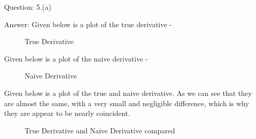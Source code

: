 \documentclass[a4paper]{article}
\begin{document}
\begin{qalist}
		\item[Question: 5.(a)] \setcounter{equation}{0}
		\item[Answer:] 	Given below is a plot of the true derivative - 
			\begin{figure}[H]			
				\vspace{0.5cm}
				\centering
				\caption{True Derivative} 
				\label{fig:q5_a_1}
				\vspace{0.5cm}
			\end{figure}
			Given below is a plot of the naive derivative - 
			\begin{figure}[H]			
				\vspace{0.5cm}
				\centering
				\caption{Naive Derivative} 
				\label{fig:q5_a_2}
				\vspace{0.5cm}
			\end{figure}
			Given below is a plot of the true and naive derivative. As we can see that they are almost the same, with a very small and negligible difference, which is why they are appear to be nearly coincident.
			\begin{figure}[H]			
				\vspace{0.5cm}
				\centering
				\caption{True Derivative and Naive Derivative compared} 
				\label{fig:q5_a_3}
				\vspace{0.5cm}
			\end{figure}
			

\end{qalist}
\end{document}
